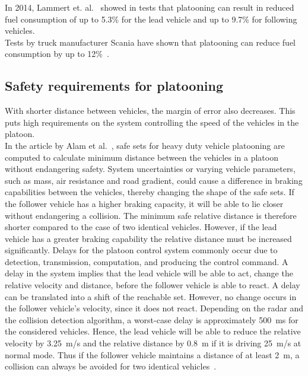 In 2014, Lammert et. al.~\cite{lammert2014} showed in tests that platooning can result in reduced fuel consumption of up to 5.3\% for the lead vehicle and up to 9.7\% for following vehicles.\\

Tests by truck manufacturer Scania have shown that platooning can reduce fuel consumption by up to 12\%~\cite{scania2015}.

\subsection{Safety requirements for platooning}
With shorter distance between vehicles, the margin of error also decreases. This puts high requirements on the system controlling the speed of the vehicles in the platoon.\\

In the article by Alam et al.~\cite{johansson2013}, safe sets for heavy duty vehicle platooning are computed to calculate minimum distance between the  vehicles in a platoon without endangering safety. System uncertainties or varying vehicle parameters, such as mass, air resistance and road gradient, could cause a difference in braking capabilities between the vehicles, thereby changing the shape of the safe sets. If the follower vehicle has a higher braking capacity, it will be able to lie closer without endangering a collision. The minimum safe relative distance is therefore shorter compared to the case of two identical vehicles. However, if the lead vehicle has a greater braking capability the relative distance must be increased significantly. Delays for the platoon control system commonly occur due to detection, transmission, computation, and producing the control command. A delay in the system implies that the lead vehicle will be able to act, change the relative velocity and distance, before the follower vehicle is able to react. A delay can be translated into a shift of the reachable set. However, no change occurs in the follower vehicle's velocity, since it does not react. Depending on the radar and the collision detection algorithm, a worst-case delay is approximately 500~ms for the considered vehicles. Hence, the lead vehicle will be able to reduce the relative velocity by 3.25~m/s and the relative distance by 0.8~m if it is driving 25~m/s at normal mode. Thus if the follower vehicle maintains a distance of at least 2~m, a collision can always be avoided for two identical vehicles~\cite{johansson2013}.

